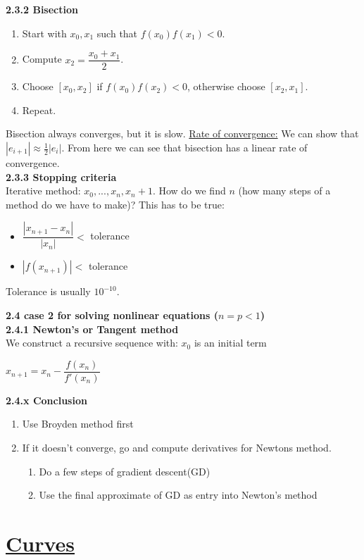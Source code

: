 \documentclass{article}
\begin{document}
\begin{multicols}{3}
\textbf{2.3.2 Bisection}
\begin{enumerate}
  \item Start with $x_0, x_1$ such that $f(x_0)f(x_1) < 0$.
  \item Compute $x_2 = \dfrac{x_0 + x_1}{2}$.
  \item Choose $[x_0, x_2]$ if $f(x_0)f(x_2) < 0$, otherwise choose $[x_2, x_1]$.
  \item Repeat.
\end{enumerate}
Bisection always converges, but it is slow.
\underline{Rate of convergence:}
We can show that $|e_{i+1}| \approx \frac{1}{2}|e_i|$. From here we can see that bisection has
a linear rate of convergence.\\

\textbf{2.3.3 Stopping criteria}\\
Iterative method: $x_0,..., x_n, x_n+1$. How do we find $n$ (how many steps of a method
do we have to make)? This has to be true:
\begin{itemize}
  \item $\dfrac{|x_{n+1} - x_n|}{|x_n|} <$ tolerance
  \item $|f(x_{n+1})|<$ tolerance
\end{itemize}
Tolerance is usually $10^{-10}$.

\textbf{2.4 case 2 for solving nonlinear equations ($n = p < 1$)}\\

\textbf{2.4.1 Newton's or Tangent method}\\
We construct a recursive sequence with: $x_0$ is an initial term
\begin{center}
    \begin{math}
        x_{n+1} = x_n - \dfrac{f(x_n)}{f'(x_n)}
    \end{math}
\end{center}

\textbf{2.4.x Conclusion}
\begin{enumerate}
    \item Use Broyden method first
    \item If it doesn't converge, go and compute derivatives for
        Newtons method.
    \begin{enumerate}
        \item Do a few steps of gradient descent(GD)
        \item Use the final approximate of GD as entry into Newton's method
    \end{enumerate}
\end{enumerate}

\section{\underline{Curves}}

\end{multicols}
\end{document}
